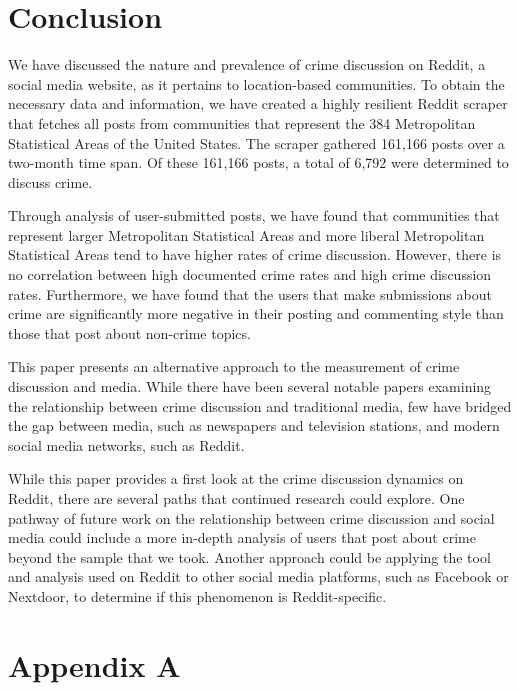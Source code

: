 \documentclass[12pt,oneside, letterpaper]{book}
\begin{document}
\chapter{Conclusion}

\par We have discussed the nature and prevalence of crime discussion on Reddit, a social media website, as it pertains to location-based communities. To obtain the necessary data and information, we have created a highly resilient Reddit scraper that fetches all posts from communities that represent the 384 Metropolitan Statistical Areas of the United States. The scraper gathered 161,166 posts over a two-month time span. Of these 161,166 posts, a total of 6,792 were determined to discuss crime. 

\par Through analysis of user-submitted posts, we have found that communities that represent larger Metropolitan Statistical Areas and more liberal Metropolitan Statistical Areas tend to have higher rates of crime discussion. However, there is no correlation between high documented crime rates and high crime discussion rates. Furthermore, we have found that the users that make submissions about crime are significantly more negative in their posting and commenting style than those that post about non-crime topics.

\par This paper presents an alternative approach to the measurement of crime discussion and media. While there have been several notable papers examining the relationship between crime discussion and traditional media, few have bridged the gap between media, such as newspapers and television stations, and modern social media networks, such as Reddit. 

\par While this paper provides a first look at the crime discussion dynamics on Reddit, there are several paths that continued research could explore. One pathway of future work on the relationship between crime discussion and social media could include a more in-depth analysis of users that post about crime beyond the sample that we took. Another approach could be applying the tool and analysis used on Reddit to other social media platforms, such as Facebook or Nextdoor, to determine if this phenomenon is Reddit-specific.

\newpage
\chapter*{Appendix A}
\end{document}
